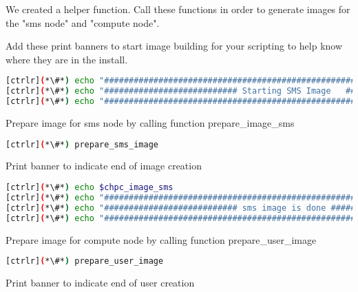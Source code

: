 	We created a helper function. Call these functions in order to generate images for the "sms node" and "compute node".


	Add these print banners to start image building for your scripting to help know where they are in the install.

\begin{lstlisting}[language=bash,keywords={},upquote=true]
[ctrlr](*\#*) echo "########################################################################"
[ctrlr](*\#*) echo "########################### Starting SMS Image   ###########################"
[ctrlr](*\#*) echo "########################################################################"
\end{lstlisting}

	Prepare image for sms node by calling function prepare\_image\_sms

\begin{lstlisting}[language=bash,keywords={},upquote=true]
[ctrlr](*\#*) prepare_sms_image
\end{lstlisting}


	Print banner to indicate end of image creation

\begin{lstlisting}[language=bash,keywords={},upquote=true]
[ctrlr](*\#*) echo $chpc_image_sms
[ctrlr](*\#*) echo "########################################################################"
[ctrlr](*\#*) echo "########################### sms image is done ##########################"
[ctrlr](*\#*) echo "########################################################################"
\end{lstlisting}
	Prepare image for compute node by calling function prepare\_user\_image

\begin{lstlisting}[language=bash,keywords={},upquote=true]
[ctrlr](*\#*) prepare_user_image
\end{lstlisting}

	Print banner to indicate end of user creation
	
